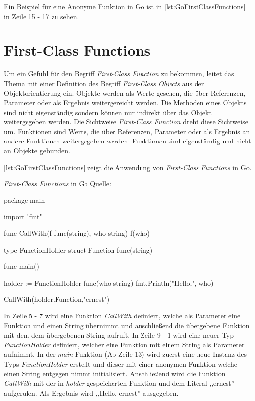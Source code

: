 Ein Beispiel für eine Anonyme Funktion in Go ist in \autoref{lst:GoFirstClassFunctions} in Zeile 15 - 17 zu sehen.

\section{First-Class Functions}
Um ein Gefühl für den Begriff \textit{First-Class Function} zu bekommen, leitet \cite[S.243f]{Esser.2011} das Thema mit einer Definition des Begriff \textit{First-Class Objects} aus der Objektorientierung ein.
Objekte werden als Werte gesehen, die über Referenzen, Parameter oder als Ergebnis weitergereicht werden.
Die Methoden eines Objekts sind nicht eigenständig sondern können nur indirekt über das Objekt weitergegeben werden.
Die Sichtweise \textit{First-Class Function} dreht diese Sichtweise um.
Funktionen sind Werte, die über Referenzen, Parameter oder als Ergebnis an andere Funktionen weitergegeben werden.
Funktionen sind eigenständig und nicht an Objekte gebunden. 

\autoref{lst:GoFirstClassFunctions} zeigt die Anwendung von \textit{First-Class Functions} in Go.

\begin{listing}[H]
\caption{\textit{First-Class Functions} in Go Quelle:\cite[]{Go.FirstClassFunctions}}
\label{lst:GoFirstClassFunctions}
\begin{GoCode}
package main

import "fmt"

func CallWith(f func(string), who string) {
    f(who)
}

type FunctionHolder struct {
    Function func(string)
}

func main() {
    holder :=   FunctionHolder{ 
                    func(who string) {
                        fmt.Println("Hello,", who) 
                    }
                }
                
    CallWith(holder.Function,"ernest")
}
\end{GoCode}
\end{listing}

In Zeile 5 - 7 wird eine Funktion \textit{CallWith} definiert, welche als Parameter eine Funktion und einen String übernimmt und anschließend die übergebene Funktion mit dem dem übergebenen String aufruft.
In Zeile 9 - 1 wird eine neuer Typ \textit{FunctionHolder} definiert, welcher eine Funktion mit einem String als Parameter aufnimmt.
In der \textit{main}-Funktion (Ab Zeile 13) wird zuerst eine neue Instanz des Typs \textit{FunctionHolder} erstellt und dieser mit einer anonymen Funktion welche einen String entgegen nimmt initialisiert.
Anschließend wird die Funktion \textit{CallWith} mit der in \textit{holder} gespeicherten Funktion und dem Literal ,,ernest'' aufgerufen.
Als Ergebnis wird ,,Hello, ernest'' ausgegeben. 

